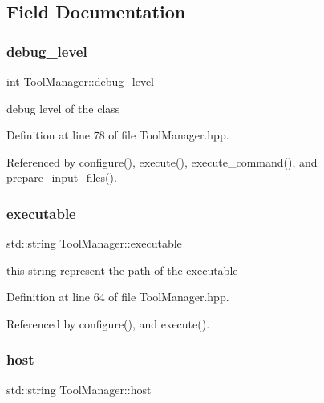 \subsection{Field Documentation}
\mbox{\label{classToolManager_a747c92f90653a6135cf76b35fba2c40f}} 
\subsubsection{\texorpdfstring{debug\+\_\+level}{debug\_level}}
{\footnotesize\ttfamily int Tool\+Manager\+::debug\+\_\+level\hspace{0.3cm}{\ttfamily [protected]}}



debug level of the class 



Definition at line 78 of file Tool\+Manager.\+hpp.



Referenced by configure(), execute(), execute\+\_\+command(), and prepare\+\_\+input\+\_\+files().

\mbox{\label{classToolManager_afe1fc7588032f94a9aedc5d3840bcbb3}} 
\subsubsection{\texorpdfstring{executable}{executable}}
{\footnotesize\ttfamily std\+::string Tool\+Manager\+::executable\hspace{0.3cm}{\ttfamily [protected]}}



this string represent the path of the executable 



Definition at line 64 of file Tool\+Manager.\+hpp.



Referenced by configure(), and execute().

\mbox{\label{classToolManager_a08d743e6d2aa5bfe5917130574d06a87}} 
\subsubsection{\texorpdfstring{host}{host}}
{\footnotesize\ttfamily std\+::string Tool\+Manager\+::host\hspace{0.3cm}{\ttfamily [protected]}}



